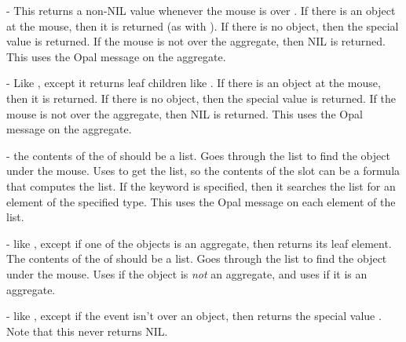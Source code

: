 \begin{description}
 - This returns a non-NIL value whenever
the mouse is over .  If there is an object at the mouse, then it is
returned (as with ).  If there is no object, then the special
value  is returned.  If the mouse is not over
the aggregate, then NIL is returned.
This uses the Opal message  on the aggregate.

\item[] 
 - Like , except it
returns leaf children like .
If there is an object at the mouse, then it is
returned.  If there is no object, then the special
value  is returned.  If the mouse is not over
the aggregate, then NIL is returned.
This uses the Opal message  on the aggregate.

 - the contents of the  of
 should be a list.  Goes through the list to find the object
under the mouse.  Uses  to get the list, so the contents of the
slot can be a formula that computes the list.
If the  keyword is specified, then it searches
the list for an element of the specified type.
This uses the Opal message  on each element of the list.

 - like , except if
one of the objects is an aggregate, then returns its leaf element.
The contents of the  of  should be a list.  Goes
through the list to find the object under the mouse.
Uses  if the object is {\it not} an aggregate, and uses
 if it is an aggregate.

 - like ,
except if the event isn't over an object, then returns the special value .
Note that this never returns NIL.


\end{description}
